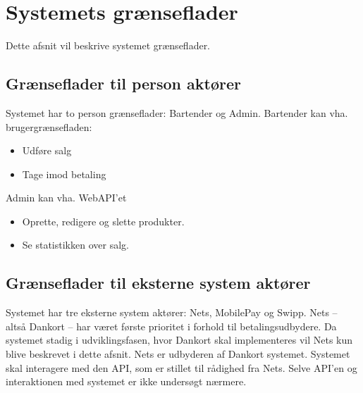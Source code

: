 \section{Systemets grænseflader}
Dette afsnit vil beskrive systemet grænseflader.

\subsection{Grænseflader til person aktører}
Systemet har to person grænseflader: Bartender og Admin.
\newline\newline
Bartender kan vha. brugergrænsefladen:
\begin{itemize}
	\item Udføre salg
	\item Tage imod betaling
\end{itemize}

Admin kan vha. WebAPI'et\citep{gh:aspnet}
\begin{itemize}
	\item Oprette, redigere og slette produkter.
    \item Se statistikken over salg.
\end{itemize}

\subsection{Grænseflader til eksterne system aktører}
Systemet har tre eksterne system aktører: Nets, MobilePay og Swipp. Nets -- altså Dankort -- har været første prioritet i forhold til betalingsudbydere. Da systemet stadig i udviklingsfasen, hvor Dankort skal implementeres vil Nets kun blive beskrevet i dette afsnit.
\newline\newline
Nets er udbyderen af Dankort systemet. Systemet skal interagere med den API, som er stillet til rådighed fra Nets. Selve API'en og interaktionen med systemet er ikke undersøgt nærmere. 


